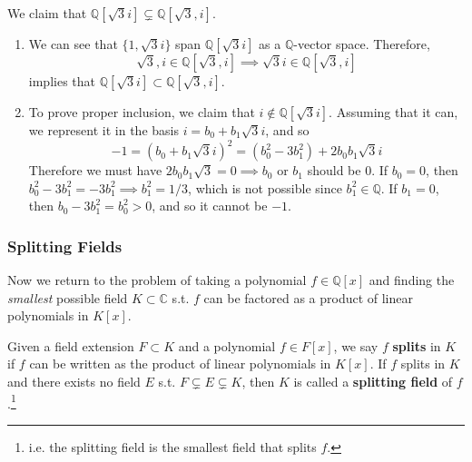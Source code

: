     \begin{example}
      We claim that $\mathbb{Q}[\sqrt{3} i] \subsetneq \mathbb{Q}[\sqrt{3}, i]$. 
      \begin{enumerate}
        \item We can see that $\{1, \sqrt{3}i \}$ span $\mathbb{Q}[\sqrt{3}i ]$ as a $\mathbb{Q}$-vector space. Therefore, 
        \begin{equation}
          \sqrt{3}, i \in \mathbb{Q}[\sqrt{3}, i] \implies \sqrt{3} i \in \mathbb{Q}[\sqrt{3}, i]
        \end{equation} 
        implies that $\mathbb{Q}[\sqrt{3} i] \subset \mathbb{Q}[\sqrt{3}, i]$. 

        \item To prove proper inclusion, we claim that $i \not\in \mathbb{Q}[\sqrt{3}i]$. Assuming that it can, we represent it in the basis $i = b_0 + b_1 \sqrt{3} i$, and so
        \begin{equation}
          -1 = (b_0 + b_1 \sqrt{3} i)^2 = (b_0^2 - 3b_1^2) + 2b_0 b_1 \sqrt{3} i
        \end{equation}
        Therefore we must have $2b_0 b_1 \sqrt{3} = 0 \implies b_0$ or $b_1$ should be $0$. If $b_0 = 0$, then $b_0^2 - 3b_1^2 = -3 b_1^2 \implies b_1^2 = 1/3$, which is not possible since $b_1^2 \in \mathbb{Q}$. If $b_1 = 0$, then $b_0 - 3 b_1^2 = b_0^2 > 0$, and so it cannot be $-1$. 
      \end{enumerate}
    \end{example}

  \subsubsection{Splitting Fields}

  Now we return to the problem of taking a polynomial $f \in \mathbb{Q}[x]$ and finding the \textit{smallest} possible field $K \subset \mathbb{C}$ s.t. $f$ can be factored as a product of linear polynomials in $K[x]$. 

  \begin{definition}
    Given a field extension $F \subset K$ and a polynomial $f \in F[x]$, we say $f$ \textbf{splits} in $K$ if $f$ can be written as the product of linear polynomials in $K[x]$. If $f$ splits in $K$ and there exists no field $E$ s.t. $F \subsetneq E \subsetneq K$, then $K$ is called a \textbf{splitting field} of $f$.\footnote{i.e. the splitting field is the smallest field that splits $f$.} 
  \end{definition}

